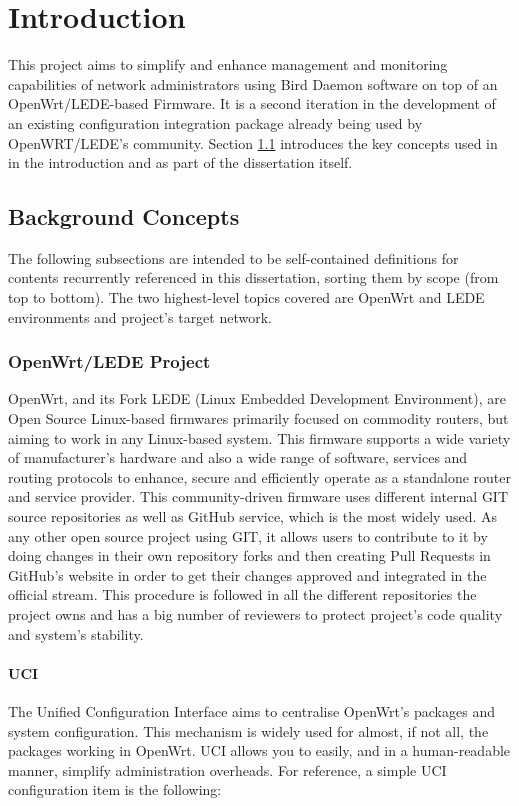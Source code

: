 \chapter{Introduction}
\label{ch:introduction}
\pagestyle{headings}

This project aims to simplify and enhance management and monitoring capabilities of network administrators using Bird Daemon software on top of an OpenWrt/LEDE-based Firmware. It is a second iteration in the development of an existing configuration integration package already being used by OpenWRT/LEDE's community. Section \ref{ch:backc} introduces the key concepts used in in the introduction and as part of the dissertation itself.

\section{Background Concepts}
\label{ch:backc}
The following subsections are intended to be self-contained definitions for contents recurrently referenced in this dissertation, sorting them by scope (from top to bottom). The two highest-level topics covered are OpenWrt and LEDE environments and project's target network.
\subsection{OpenWrt/LEDE Project}
\label{subsec:owrtlp}
OpenWrt, and its Fork LEDE (Linux Embedded Development Environment), are Open Source Linux-based firmwares primarily focused on commodity routers, but aiming to work in any Linux-based system. This firmware supports a wide variety of manufacturer's hardware and also a wide range of software, services and routing protocols to enhance, secure and efficiently operate as a standalone router and service provider. This community-driven firmware uses different internal GIT source repositories as well as GitHub service, which is the most widely used. As any other open source project using GIT, it allows users to contribute to it by doing changes in their own repository forks and then creating Pull Requests in GitHub's website in order to get their changes approved and integrated in the official stream. This procedure is followed in all the different repositories the project owns and has a big number of reviewers to protect project's code quality and system's stability.

\subsubsection{UCI}
The Unified Configuration Interface aims to centralise OpenWrt's packages and system configuration. This mechanism is widely used for almost, if not all, the packages working in OpenWrt. UCI allows you to easily, and in a human-readable manner, simplify administration overheads. For reference, a simple UCI configuration item is the following: 

